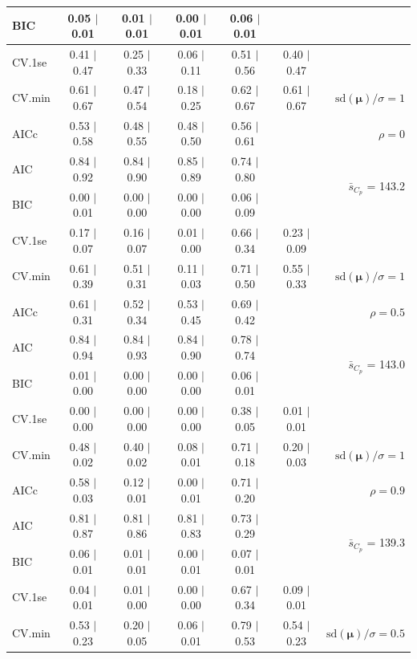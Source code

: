 \documentclass[12pt]{article}
\newcommand{\mr}[1]{\mathrm{#1}}
\newcommand{\bm}[1]{\mathbf{#1}}
\begin{document}
\begin{table}[p]
\begin{center}
\begin{tabular}{l*{5}{c}|r}
BIC & 0.05 $\mid$ 0.01 & 0.01 $\mid$ 0.01 & 0.00 $\mid$ 0.01 & 0.06 $\mid$ 0.01 & & \\
 \hline 
CV.1se & 0.41 $\mid$ 0.47 & 0.25 $\mid$ 0.33 & 0.06 $\mid$ 0.11 & 0.51 $\mid$ 0.56 & 0.40 $\mid$ 0.47 &\\
CV.min & 0.61 $\mid$ 0.67 & 0.47 $\mid$ 0.54 & 0.18 $\mid$ 0.25 & 0.62 $\mid$ 0.67 & 0.61 $\mid$ 0.67 &  $\mr{sd}(\bm{\mu})/\sigma=1$ \\
AICc & 0.53 $\mid$ 0.58 & 0.48 $\mid$ 0.55 & 0.48 $\mid$ 0.50 & 0.56 $\mid$ 0.61 & & $\rho=0$ \\
AIC & 0.84 $\mid$ 0.92 & 0.84 $\mid$ 0.90 & 0.85 $\mid$ 0.89 & 0.74 $\mid$ 0.80 & & \multirow{2}{*}{$\bar{s}_{C_p}$ = 143.2} \\
BIC & 0.00 $\mid$ 0.01 & 0.00 $\mid$ 0.00 & 0.00 $\mid$ 0.00 & 0.06 $\mid$ 0.09 & & \\
 \hline 
CV.1se & 0.17 $\mid$ 0.07 & 0.16 $\mid$ 0.07 & 0.01 $\mid$ 0.00 & 0.66 $\mid$ 0.34 & 0.23 $\mid$ 0.09 &\\
CV.min & 0.61 $\mid$ 0.39 & 0.51 $\mid$ 0.31 & 0.11 $\mid$ 0.03 & 0.71 $\mid$ 0.50 & 0.55 $\mid$ 0.33 &  $\mr{sd}(\bm{\mu})/\sigma=1$ \\
AICc & 0.61 $\mid$ 0.31 & 0.52 $\mid$ 0.34 & 0.53 $\mid$ 0.45 & 0.69 $\mid$ 0.42 & & $\rho=0.5$ \\
AIC & 0.84 $\mid$ 0.94 & 0.84 $\mid$ 0.93 & 0.84 $\mid$ 0.90 & 0.78 $\mid$ 0.74 & & \multirow{2}{*}{$\bar{s}_{C_p}$ = 143.0} \\
BIC & 0.01 $\mid$ 0.00 & 0.00 $\mid$ 0.00 & 0.00 $\mid$ 0.00 & 0.06 $\mid$ 0.01 & & \\
 \hline 
CV.1se & 0.00 $\mid$ 0.00 & 0.00 $\mid$ 0.00 & 0.00 $\mid$ 0.00 & 0.38 $\mid$ 0.05 & 0.01 $\mid$ 0.01 &\\
CV.min & 0.48 $\mid$ 0.02 & 0.40 $\mid$ 0.02 & 0.08 $\mid$ 0.01 & 0.71 $\mid$ 0.18 & 0.20 $\mid$ 0.03 &  $\mr{sd}(\bm{\mu})/\sigma=1$ \\
AICc & 0.58 $\mid$ 0.03 & 0.12 $\mid$ 0.01 & 0.00 $\mid$ 0.01 & 0.71 $\mid$ 0.20 & & $\rho=0.9$ \\
AIC & 0.81 $\mid$ 0.87 & 0.81 $\mid$ 0.86 & 0.81 $\mid$ 0.83 & 0.73 $\mid$ 0.29 & & \multirow{2}{*}{$\bar{s}_{C_p}$ = 139.3} \\
BIC & 0.06 $\mid$ 0.01 & 0.01 $\mid$ 0.01 & 0.00 $\mid$ 0.01 & 0.07 $\mid$ 0.01 & & \\
 \hline 
CV.1se & 0.04 $\mid$ 0.01 & 0.01 $\mid$ 0.00 & 0.00 $\mid$ 0.00 & 0.67 $\mid$ 0.34 & 0.09 $\mid$ 0.01 &\\
CV.min & 0.53 $\mid$ 0.23 & 0.20 $\mid$ 0.05 & 0.06 $\mid$ 0.01 & 0.79 $\mid$ 0.53 & 0.54 $\mid$ 0.23 &  $\mr{sd}(\bm{\mu})/\sigma=0.5$ \\

\end{tabular}
\end{center}
\end{table}
\end{document}
